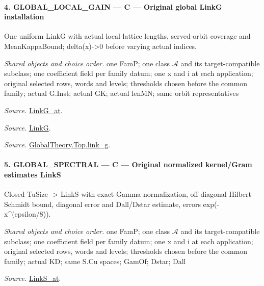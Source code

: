 \documentclass[11pt,a4paper]{article}
\numberwithin{equation}{section}
\theoremstyle{remark}\newtheorem{remark}[theorem]{Remark}
\begin{document}
\paragraph{4. GLOBAL\_\allowbreak LOCAL\_\allowbreak GAIN — C — Original global LinkG installation}

One uniform LinkG with actual local lattice lengths, served-orbit coverage and MeanKappaBound; delta(x)->0 before varying actual indices.

\emph{Shared objects and choice order.} one FamP; one class $\mathcal A$ and its target-compatible subclass; one coefficient field per family datum; one x and i at each application; original selected rows, words and levels; thresholds chosen before the common family; actual G.Inst; actual GK; actual lenMN; same orbit representatives

\emph{Source.} \href{https://github.com/CocoSgt/riemann-hypothesis-lean/blob/7cbf7a0c32fca1badf05931879a37c3f8a2b03b4/src/Formalism/SharpRestriction/GlobalTheoremInputs.lean#L122-L137}{LinkG\_\allowbreak at}.

\emph{Source.} \href{https://github.com/CocoSgt/riemann-hypothesis-lean/blob/7cbf7a0c32fca1badf05931879a37c3f8a2b03b4/src/Formalism/SharpRestriction/GlobalTheoremInputs.lean#L138-L141}{LinkG}.

\emph{Source.} \href{https://github.com/CocoSgt/riemann-hypothesis-lean/blob/7cbf7a0c32fca1badf05931879a37c3f8a2b03b4/src/Development/AbelianVarietyTheory/Proofs/GlobalInterpolation/LinkG.lean#L14-L27}{GlobalTheory.Top.link\_\allowbreak g}.



\paragraph{5. GLOBAL\_\allowbreak SPECTRAL — C — Original normalized kernel/Gram estimates LinkS}

Closed TuSize -> LinkS with exact Gamma normalization, off-diagonal Hilbert-Schmidt bound, diagonal error and Dall/Dstar estimate, errors exp(-x\textasciicircum{}(epsilon/8)).

\emph{Shared objects and choice order.} one FamP; one class $\mathcal A$ and its target-compatible subclass; one coefficient field per family datum; one x and i at each application; original selected rows, words and levels; thresholds chosen before the common family; actual KD; same S.Cu spaces; GamOf; Dstar; Dall

\emph{Source.} \href{https://github.com/CocoSgt/riemann-hypothesis-lean/blob/7cbf7a0c32fca1badf05931879a37c3f8a2b03b4/src/Formalism/SharpRestriction/GlobalTheoremInputs.lean#L145-L149}{LinkS\_\allowbreak at}.
\end{document}
